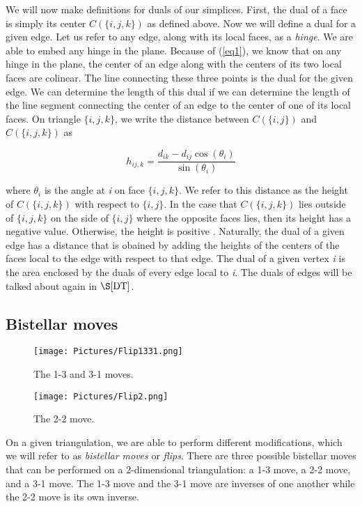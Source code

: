 \documentclass[12pt]{article}
\begin{document}
 We will now make definitions for duals of our simplices. First, the dual of a face is simply its center $C(\{i, j, k\})$ as defined above. Now we will define a dual for a given edge. Let us refer to any edge, along with its local faces, as a \textit{hinge}. We are able to embed any hinge in the plane. Because of (\ref{eq1}), we know that on any hinge in the plane, the center of an edge along with the centers of its two local faces are colinear. The line connecting these three points is the dual for the given edge. We can determine the length of this dual if we can determine the length of the line segment connecting the center of an edge to the center of one of its local faces. On triangle $\{i, j, k\}$, we write the distance between $C(\{i, j\})$ and $C(\{i, j, k\})$ as 

\begin{equation}
\label{eq3}
h_{ij,k} = \frac{d_{ik} - d_{ij}\cos(\theta_i)}{\sin(\theta_i)}
\end{equation}

 where $\theta_i$ is the angle at \textit{i} on face $\{i, j, k\}$. We refer to this distance as the height of $C(\{i, j, k\})$ with respect to $\{i, j\}$. In the case that $C(\{i, j, k\})$ lies outside of $\{i, j, k\}$ on the side of $\{i, j\}$ where the opposite faces lies, then its height has a negative value. Otherwise, the height is positive \cite{Dave}. Naturally, the dual of a given edge has a distance that is obained by adding the heights of the centers of the faces local to the edge with respect to that edge. The dual of a given vertex \textit{i} is the area enclosed by the duals of every edge local to \textit{i}. The duals of edges will be talked about again in $\S\ref{DT}$.

\subsection{Bistellar moves}

\begin{figure}
\centering
\texttt{[image: Pictures/Flip1331.png]}
\caption{The 1-3 and 3-1 moves.}
\label{fig:flip2}
\end{figure}


\begin{figure}
\centering
\texttt{[image: Pictures/Flip2.png]}
\caption{The 2-2 move.}
\label{fig:flip}
\end{figure}

 On a given triangulation, we are able to perform different modifications, which we will refer to as \textit{bistellar moves} or \textit{flips}. There are three possible bistellar moves that can be performed on a 2-dimensional triangulation: a 1-3 move, a 2-2 move, and a 3-1 move. The 1-3 move and the 3-1 move are inverses of one another while the 2-2 move is its own inverse.
\end{document}
